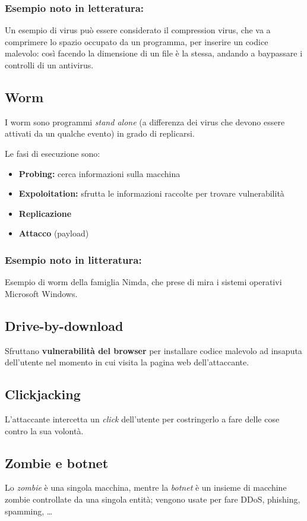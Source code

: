 \documentclass{report}
\begin{document}
\subsubsection{Esempio noto in letteratura:}
Un esempio di virus può essere considerato il compression virus, che va a comprimere lo spazio occupato da un programma, per inserire un codice malevolo:
così facendo la dimensione di un file è la stessa, andando a baypassare i controlli di un antivirus.

\subsection{Worm}
I worm sono programmi \textit{stand alone} (a differenza dei virus che devono essere attivati 
da un qualche evento) in grado di replicarsi.

\noindent Le fasi di esecuzione sono:
\begin{itemize}
    \item \textbf{Probing:} cerca informazioni sulla macchina 
    \item \textbf{Expoloitation:} sfrutta le informazioni raccolte per trovare vulnerabilità
    \item \textbf{Replicazione}
    \item \textbf{Attacco} (payload)
\end{itemize}

\subsubsection{Esempio noto in litteratura:}
Esempio di worm della famiglia Nimda, che prese di mira i sistemi operativi Microsoft Windows.

\subsection{Drive-by-download}
Sfruttano \textbf{vulnerabilità del browser} per installare codice malevolo ad insaputa dell'utente 
nel momento in cui visita la pagina web dell'attaccante. 

\subsection{Clickjacking}
L'attaccante intercetta un \textit{click} dell'utente per costringerlo a fare delle cose 
contro la sua volontà.

\subsection{Zombie e botnet}
Lo \textit{zombie} è una singola macchina, mentre la \textit{botnet} è un insieme di macchine 
zombie controllate da una singola entità; vengono usate per fare DDoS, phishing, spamming, \dots
\end{document}
